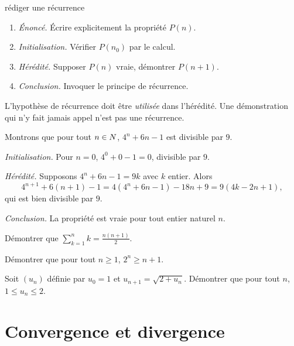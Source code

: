 \begin{methode}{rédiger une récurrence}
\begin{enumerate}[label=\textbf{\arabic*.}, leftmargin=*, itemsep=0.15em]
  \item \emph{Énoncé.} Écrire explicitement la propriété $P(n)$.
  \item \emph{Initialisation.} Vérifier $P(n_{0})$ par le calcul.
  \item \emph{Hérédité.} Supposer $P(n)$ vraie, démontrer $P(n+1)$.
  \item \emph{Conclusion.} Invoquer le principe de récurrence.
\end{enumerate}
\end{methode}

\begin{avertissement}
L'hypothèse de récurrence doit être \emph{utilisée} dans l'hérédité. Une
démonstration qui n'y fait jamais appel n'est pas une récurrence.
\end{avertissement}

\begin{exemple}
Montrons que pour tout $n \in N$, $4^{n}+6n-1$ est divisible par $9$.

\emph{Initialisation.} Pour $n = 0$, $4^{0}+0-1 = 0$, divisible par $9$.

\emph{Hérédité.} Supposons $4^{n}+6n-1 = 9k$ avec $k$ entier. Alors
\[
  4^{n+1}+6(n+1)-1 = 4\left(4^{n}+6n-1\right)-18n+9
  = 9\left(4k-2n+1\right),
\]
qui est bien divisible par $9$.

\emph{Conclusion.} La propriété est vraie pour tout entier naturel $n$.
\end{exemple}

\begin{entrainement}[récurrence]
\exo[\niveau{1}] Démontrer que $\displaystyle\sum_{k=1}^{n}k
= \frac{n(n+1)}{2}$.

\exo[\niveau{2}] Démontrer que pour tout $n \geq 1$, $2^{n} \geq n+1$.

\exo[\niveau{3}] Soit $(u_{n})$ définie par $u_{0} = 1$ et
$u_{n+1} = \sqrt{2+u_{n}}$. Démontrer que pour tout $n$,
$1 \leq u_{n} \leq 2$.
\end{entrainement}

\section{Convergence et divergence}

